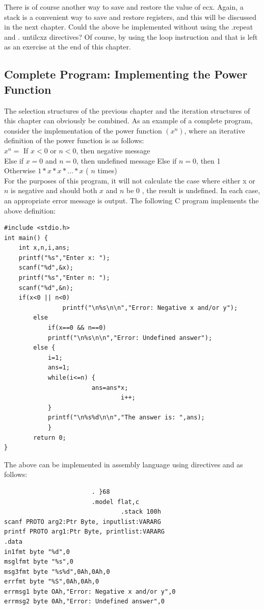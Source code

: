 \documentclass[10pt]{book}
\begin{document}
There is of course another way to save and restore the value of ecx. Again, a stack is a convenient way to save and restore registers, and this will be discussed in the next chapter. Could the above be implemented without using the .repeat and . untilcxz directives? Of course, by using the loop instruction and that is left as an exercise at the end of this chapter.

\subsection{Complete Program: Implementing the Power Function}
The selection structures of the previous chapter and the iteration structures of this chapter can obviously be combined. As an example of a complete program, consider the implementation of the power function $\left(x^{n}\right)$, where an iterative definition of the power function is as follows:\\
$x^{n}=$ If $x<0$ or $n<0$, then negative message\\
Else if $x=0$ and $n=0$, then undefined message Else if $n=0$, then 1\\
Otherwise $1 * x * x * \ldots * x$ ( $n$ times)\\
For the purposes of this program, it will not calculate the case where either x or $n$ is negative and should both $x$ and $n$ be 0 , the result is undefined. In each case, an appropriate error message is output. The following C program implements the above definition:

\begin{verbatim}
#include <stdio.h>
int main() {
    int x,n,i,ans;
    printf("%s","Enter x: ");
    scanf("%d",&x);
    printf("%s","Enter n: ");
    scanf("%d",&n);
    if(x<0 || n<0)
                printf("\n%s\n\n","Error: Negative x and/or y");
        else
            if(x==0 && n==0)
            printf("\n%s\n\n","Error: Undefined answer");
        else {
            i=1;
            ans=1;
            while(i<=n) {
                        ans=ans*x;
                                i++;
            }
            printf("\n%s%d\n\n","The answer is: ",ans);
            }
        return 0;
}
\end{verbatim}

The above can be implemented in assembly language using directives and as follows:


\begin{verbatim}
                        . }68
                        .model flat,c
                                .stack 100h
scanf PROTO arg2:Ptr Byte, inputlist:VARARG
printf PROTO arg1:Ptr Byte, printlist:VARARG
.data
in1fmt byte "%d",0
msglfmt byte "%s",0
msg3fmt byte "%s%d",0Ah,0Ah,0
errfmt byte "%S",0Ah,0Ah,0
errmsg1 byte OAh,"Error: Negative x and/or y",0
errmsg2 byte 0Ah,"Error: Undefined answer",0
\end{verbatim}
\end{document}
